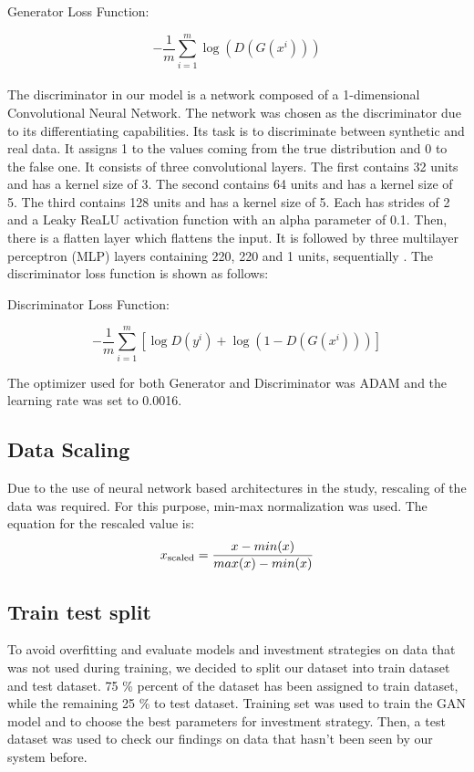 \documentclass[11pt]{article} %
\begin{document}
\begin{center}   Generator Loss Function:  \end{center}
\begin{equation}
-\frac{1}{m} \sum_{i=1}^{m} \log \left(D\left(G\left(x^{i}\right)\right)\right)
\end{equation}\\

The discriminator in our model is a network composed of a 1-dimensional Convolutional Neural Network. The network was chosen as the discriminator due to its differentiating capabilities. Its task is to discriminate between synthetic and real data. It assigns 1 to the values coming from the true distribution and 0 to the false one. It consists of three convolutional layers. The first contains 32 units and has a kernel size of 3. The second contains 64 units and has a kernel size of 5. The third contains 128 units and has a kernel size of 5. Each has strides of 2 and a Leaky ReaLU activation function with an alpha parameter of 0.1. Then, there is a flatten layer which flattens the input. It is followed by three multilayer perceptron (MLP) layers containing 220, 220 and 1 units, sequentially \cite{gan-stock}\cite{gan-stock2}. 
The discriminator loss function is shown as follows: 
\begin{center}  Discriminator Loss Function: \end{center}
\begin{equation}
-\frac{1}{m} \sum_{i=1}^{m}\left[\log D\left(y^{i}\right)+\log \left(1-D\left(G\left(x^{i}\right)\right)\right)\right]
\end{equation}

The optimizer used for both Generator and Discriminator was ADAM and the learning rate was set to 0.0016.

\subsection{Data Scaling}
Due to the use of neural network based architectures in the study, rescaling of the data was required. For this purpose, min-max normalization was used. The equation for the rescaled value is: 
\begin{equation} x\textsubscript{scaled} = \frac{x - min(x)}{max(x) - min(x)} \end{equation}

\subsection{Train test split}
To avoid overfitting and evaluate models and investment strategies on data that was not used during training, we decided to split our dataset into train dataset and test dataset. 75 \% percent of the dataset has been assigned to train dataset, while the remaining 25 \% to test dataset. Training set was used to train the GAN model and to choose the best parameters for investment strategy. Then, a test dataset was used to check our findings on data that hasn't been seen by our system before.
\end{document}
